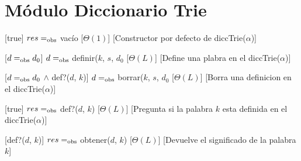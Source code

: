 \section{M\'{o}dulo Diccionario Trie}

\begin{Interfaz}
  
  \begin{paramFormales}
    \paramGeneros{$\alpha$}

    

  \end{paramFormales}




    [true]
    {$res =_{\mathrm{obs}}$ vac\'{i}o}
    [$\Theta(1)$]
    [Constructor por defecto de diccTrie($\alpha$)]

    [$d =_{\mathrm{obs}} d_{0}$]
    {$d =_{\mathrm{obs}}$ definir($k$, $s$, $d_{0}$}
    [$\Theta(L)$]
    [Define una plabra en el diccTrie($\alpha$)]

    [$d =_{\mathrm{obs}} d_{0}$ $\land$ def?($d$, $k$)]
    {$d =_{\mathrm{obs}}$ borrar($k$, $s$, $d_{0}$}
    [$\Theta(L)$]
    [Borra una definicion en el diccTrie($\alpha$)]

    [true]
    {$res =_{\mathrm{obs}}$ def?($d$, $k$)}
    [$\Theta(L)$]
    [Pregunta si la palabra $k$ esta definida en el diccTrie($\alpha$)]

    [def?($d$, $k$)]
    {$res =_{\mathrm{obs}}$ obtener($d$, $k$)}
    [$\Theta(L)$]
    [Devuelve el significado de la palabra $k$]

\end{Interfaz}

